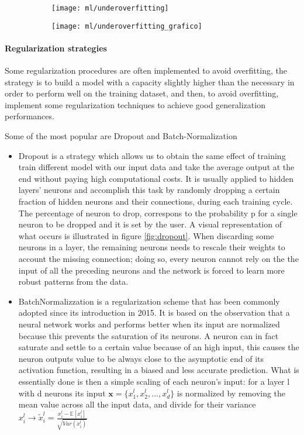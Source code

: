 \documentclass[a4paper,11pt]{article}
\begin{document}
\begin{figure}
\begin{subfigure}{0.4\textwidth}
\texttt{[image: ml/underoverfitting]}
\caption{}
\label{}
\end{subfigure}
\begin{subfigure}{0.4\textwidth}
\texttt{[image: ml/underoverfitting\_grafico]}
\caption{}
\label{}
\end{subfigure}
\caption{}
\label{fig:underoverfitting}
\end{figure}

\paragraph{Regularization strategies} \hfill
Some regularization procedures are often implemented to avoid overfitting, the strategy is to build a model with a capacity slightly higher than the necessary in order to perform well on the training dataset, and then, to avoid overfitting, implement some regularization techniques to achieve good generalization performances.

Some of the most popular are Dropout and Batch-Normalization

\begin{itemize}
\item Dropout is a strategy which allows us to obtain the same effect of training train different model with our input data and take the average output at the end without paying high computational costs.
It is usually applied to hidden layers' neurons and accomplish this task by randomly dropping a certain fraction of hidden neurons and their connections, during each training cycle. The percentage of neuron to drop, correspons to the probability p for a single neuron to be dropped and it is set by the user.
A visual representation of what occurs is illustrated in figure \ref{fig:dropout}.
When discarding some neurons in a layer, the remaining neurons needs to rescale their weights to account the missing connection; doing so, every neuron cannot rely on the the input of all the preceding neurons and the network is forced to learn more robust patterns from the data.
\item BatchNormalizzation is a regularization scheme that has been commonly adopted since its introduction in 2015. It is based on the observation that a neural network works and performs better when its input are normalized because this prevents the saturation of its neurons.
A neuron can in fact saturate and settle to a certain value because of an high input, this causes the neuron outputs value to be always close to the asymptotic end of its activation function, resulting in a biased and less accurate prediction.
What is essentially done is then a simple scaling of each neuron's input: for a layer l with d neurons its input $\mathbf{x} = \{x_1^l, x_2^l, ..., x_d^l\}$ is normalized by removing the mean value across all the input data, and divide for their variance $x_i^l \rightarrow \tilde x_i^l = \frac{x_i^{l} - \mathbb{E}[x_i^l]}{\sqrt{Var(x_i^l)}} $

\end{itemize}
\end{document}
